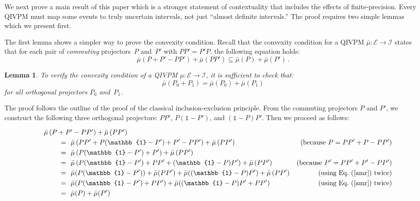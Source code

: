 \documentclass[english,reprint, aps, prl,superscriptaddress, showpacs,
showkeys, longbibliography, amsmath, amssymb, floatfix]{revtex4-1}
\theoremstyle{plain}
\newtheorem{lemma}{Lemma}
\theoremstyle{definition}
\newcommand{\events}{\ensuremath{\mathcal{E}}}
\begin{document}
We next prove a main result of this paper which is a stronger
statement of contextuality that includes the effects of
finite-precision.  Every QIVPM must map some events to truly uncertain
intervals, not just ``almost definite intervals.'' The proof requires
two simple lemmas which we present first. 

The first lemma shows a simpler way to prove the convexity
condition. Recall that the convexity condition for a QIVPM
$\bar{\mu} : \events \rightarrow \mathscr{I}$ states that for each pair of
\emph{commuting} projectors~$P$ and~$P'$ with $PP'=P'P$, the following
equation holds:
\begin{equation}
\bar{\mu}\left(P+P'-PP'\right)+\bar{\mu}\left(PP'\right)\subseteq\bar{\mu}\left(P\right)+\bar{\mu}\left(P'\right)\,.
\end{equation}

\begin{lemma}\label{lemma:verify-convexity}
  To verify the convexity condition of a QIVPM
  $\mu : \events \rightarrow \mathscr{I}$, it is sufficient to check
  that:
\begin{equation}
\bar{\mu}\left(P_{0}+P_{1}\right)=\bar{\mu}\left(P_{0}\right)+\bar{\mu}\left(P_{1}\right)\label{amr}
\end{equation}
 for all orthogonal projectors $P_{0}$ and~$P_{1}$.
\end{lemma}
\noindent The proof follows the outline of the proof of the classical
inclusion-exclusion principle. From the commuting projectors $P$ and
$P'$, we construct the following three orthogonal projectors: $PP'$,
$P(\mathbb{1}-P')$, and $(\mathbb{1}-P)P'$. Then we proceed as
follows:
\begin{widetext}
\begin{equation*}
\begin{aligned}
\noalign{$\bar{\mu}\left(P+P'-PP'\right)+\bar{\mu}\left(PP'\right)$}
\qquad\qquad=~~&\bar{\mu}\left(PP'+P(\mathbb{1}-P')+P'-PP'\right)+\bar{\mu}\left(PP'\right) 
  & (\mbox{because } P = PP' + P - PP') \\
=~~& \bar{\mu}\left(P(\mathbb{1}-P')+P'\right)+\bar{\mu}\left(PP'\right) \\
=~~& \bar{\mu}\left(P(\mathbb{1}-P')+PP'+(\mathbb{1}-P)P'\right)+\bar{\mu}\left(PP'\right) 
      & (\mbox{because } P' = PP' + P' - PP') \\
=~~& \bar{\mu}(P(\mathbb{1}-P'))+\bar{\mu}(PP')+\bar{\mu}((\mathbb{1}-P)P')+
    \bar{\mu}\left(PP'\right) & (\mbox{using Eq.~(\ref{amr}) twice}) \\
=~~& \bar{\mu}(P(\mathbb{1}-P')+PP')+\bar{\mu}((\mathbb{1}-P)P'+PP') & (\mbox{using Eq.~(\ref{amr}) twice}) \\
=~~& \bar{\mu}(P) + \bar{\mu}(P')
\end{aligned}
\end{equation*}
\end{widetext}
\end{document}
